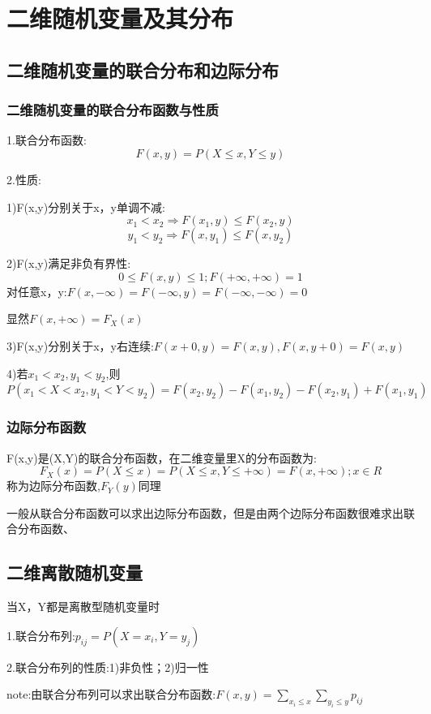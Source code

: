 \documentclass[11pt,twoside,a4paper]{ctexart}
\begin{document}
    \section{二维随机变量及其分布}
    \subsection{二维随机变量的联合分布和边际分布}
    \subsubsection{二维随机变量的联合分布函数与性质}
    1.联合分布函数:
    \[F(x,y) = P(X\leq x,Y\leq y)\]

    2.性质:
    \begin{minipage}[t]{0.9\linewidth}
        1)F(x,y)分别关于x，y单调不减:
        \[x_1<x_2  \Rightarrow  F(x_1,y) \leq F(x_2,y) \]
        \[y_1<y_2  \Rightarrow  F(x,y_1) \leq F(x,y_2)  \]

        2)F(x,y)满足非负有界性:
        \[0\leq F(x,y)\leq 1;F(+\infty,+\infty) = 1\]
        对任意x，y:$F(x,-\infty) = F(-\infty,y) = F(-\infty,-\infty) = 0$

        显然$F(x,+\infty) = F_X(x)$

        3)F(x,y)分别关于x，y右连续:$F(x+0,y) = F(x,y),F(x,y+0) = F(x,y) $

        4)若$x_1<x_2,y_1<y_2$,则
        \[P(x_1<X<x_2,y_1<Y<y_2) = F(x_2,y_2) - F(x_1,y_2) - F(x_2,y_1) + F(x_1,y_1)\]
    \end{minipage}

    \subsubsection{边际分布函数}
    F(x,y)是(X,Y)的联合分布函数，在二维变量里X的分布函数为:
    \[F_X(x) = P(X\leq x) =P(X\leq x,Y\leq +\infty) = F(x,+\infty ); x\in R\]
    称为边际分布函数,$F_Y(y)$同理

    一般从联合分布函数可以求出边际分布函数，但是由两个边际分布函数很难求出联合分布函数、

    \subsection{二维离散随机变量}
    当X，Y都是离散型随机变量时
    
    1.联合分布列:$p_{ij} = P(X = x_i,Y = y_j)$

    2.联合分布列的性质:1)非负性；2)归一性

    note:由联合分布列可以求出联合分布函数:$F(x,y) = \sum _{x_i\leq x}\sum _{y_i\leq y}p_{ij}$
\end{document}
